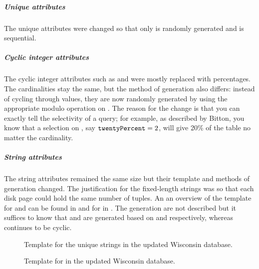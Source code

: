 \subparagraph{Unique attributes} The unique attributes were changed so that only
 is randomly generated and
 is sequential.

\subparagraph{Cyclic integer attributes} The cyclic integer attributes such as
 and  were mostly replaced
with percentages. The cardinalities stay the same, but the method of generation
also differs: instead of cycling through values, they are now randomly generated
by using the appropriate modulo operation on . The
reason for the change is that you can exactly tell the selectivity of a query;
for example, as described by Bitton, you know that a selection on
, say $\mathtt{twentyPercent} = 2$,
will give 20\% of the table no matter the cardinality.

\subparagraph{String attributes} The string attributes remained the same size
but their template and methods of generation changed. The justification for the
fixed-length strings was so that each disk page could hold the same number of
tuples. An an overview of the template for  and
 can be found in 
and for  in . The
generation are not described but it suffices to know that
 and  are generated
based on  and 
respectively, whereas  continues to be cyclic.

\begin{figure}[h]
    \centering
    \NewWisconsinUString

    \caption{Template for the unique strings in the updated Wisconsin database.}
    \label{fig:NewWisconsinUniqueString}
\end{figure}

\begin{figure}[h]
    \centering
    \NewWisconsinCyclicStringDef{}

    \caption{Template for  in the updated Wisconsin database.}
    \label{fig:NewWisconsinString4}
\end{figure}


